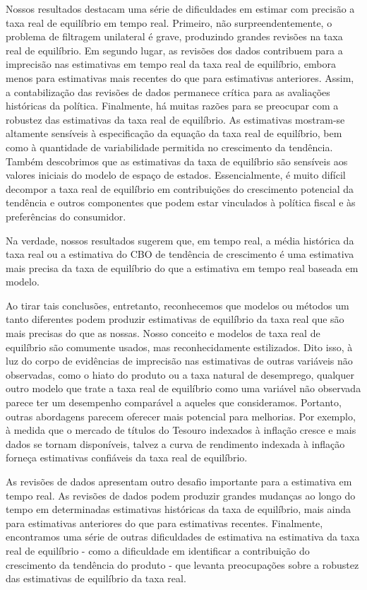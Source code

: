 Nossos resultados destacam uma série de dificuldades em estimar com precisão a taxa real de equilíbrio em tempo real. Primeiro, não surpreendentemente, o problema de filtragem unilateral é grave, produzindo grandes revisões na taxa real de equilíbrio. Em segundo lugar, as revisões dos dados contribuem para a imprecisão nas estimativas em tempo real da taxa real de equilíbrio, embora menos para estimativas mais recentes do que para estimativas anteriores. Assim, a contabilização das revisões de dados permanece crítica para as avaliações históricas da política. Finalmente, há muitas razões para se preocupar com a robustez das estimativas da taxa real de equilíbrio. As estimativas mostram-se altamente sensíveis à especificação da equação da taxa real de equilíbrio, bem como à quantidade de variabilidade permitida no crescimento da tendência. Também descobrimos que as estimativas da taxa de equilíbrio são sensíveis aos valores iniciais do modelo de espaço de estados. Essencialmente, é muito difícil decompor a taxa real de equilíbrio em contribuições do crescimento potencial da tendência e outros componentes que podem estar vinculados à política fiscal e às preferências do consumidor.

Na verdade, nossos resultados sugerem que, em tempo real, a média histórica da taxa real ou a estimativa do CBO de tendência de crescimento é uma estimativa mais precisa da taxa de equilíbrio do que a estimativa em tempo real baseada em modelo.

Ao tirar tais conclusões, entretanto, reconhecemos que modelos ou métodos um tanto diferentes podem produzir estimativas de equilíbrio da taxa real que são mais precisas do que as nossas. Nosso conceito e modelos de taxa real de equilíbrio são comumente usados, mas reconhecidamente estilizados.
Dito isso, à luz do corpo de evidências de imprecisão nas estimativas de outras variáveis não observadas, como o hiato do produto ou a taxa natural de desemprego, qualquer outro modelo que trate a taxa real de equilíbrio como uma variável não observada parece ter um desempenho comparável a aqueles que consideramos. Portanto, outras abordagens parecem oferecer mais potencial para melhorias. Por exemplo, à medida que o mercado de títulos do Tesouro indexados à inflação cresce e mais dados se tornam disponíveis, talvez a curva de rendimento indexada à inflação forneça estimativas confiáveis da taxa real de equilíbrio.

As revisões de dados apresentam outro desafio importante para a estimativa em tempo real. As revisões de dados podem produzir grandes mudanças ao longo do tempo em determinadas estimativas históricas da taxa de equilíbrio, mais ainda para estimativas anteriores do que para estimativas recentes. Finalmente, encontramos uma série de outras dificuldades de estimativa na estimativa da taxa real de equilíbrio - como a dificuldade em identificar a contribuição do crescimento da tendência do produto - que levanta preocupações sobre a robustez das estimativas de equilíbrio da taxa real.

